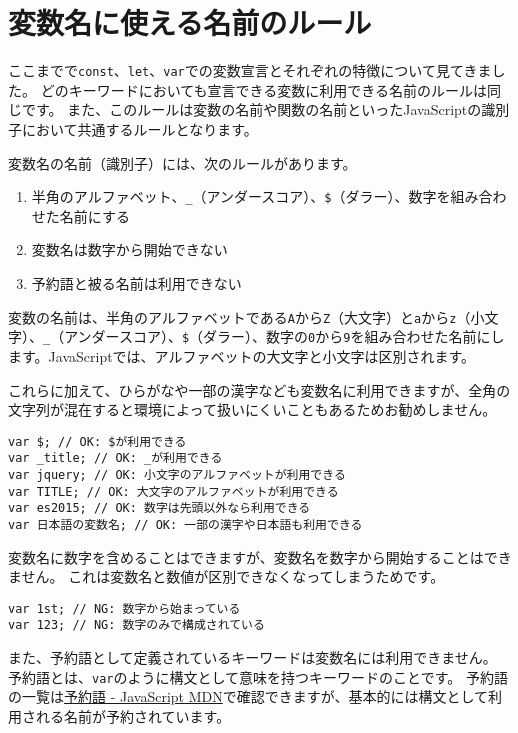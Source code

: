 \hypertarget{variable-name}{%
\section{変数名に使える名前のルール}\label{variable-name}}

ここまでで\texttt{const}、\texttt{let}、\texttt{var}での変数宣言とそれぞれの特徴について見てきました。
どのキーワードにおいても宣言できる変数に利用できる名前のルールは同じです。
また、このルールは変数の名前や関数の名前といったJavaScriptの識別子において共通するルールとなります。

変数名の名前（識別子）には、次のルールがあります。

\begin{enumerate}
\def\labelenumi{\arabic{enumi}.}
\item
  半角のアルファベット、\texttt{\_}（アンダースコア）、\texttt{\$}（ダラー）、数字を組み合わせた名前にする
\item
  変数名は数字から開始できない
\item
  予約語と被る名前は利用できない
\end{enumerate}

変数の名前は、半角のアルファベットである\texttt{A}から\texttt{Z}（大文字）と\texttt{a}から\texttt{z}（小文字）、\texttt{\_}（アンダースコア）、\texttt{\$}（ダラー）、数字の\texttt{0}から\texttt{9}を組み合わせた名前にします。JavaScriptでは、アルファベットの大文字と小文字は区別されます。

これらに加えて、ひらがなや一部の漢字なども変数名に利用できますが、全角の文字列が混在すると環境によって扱いにくいこともあるためお勧めしません。

\begin{lstlisting}
var $; // OK: $が利用できる
var _title; // OK: _が利用できる
var jquery; // OK: 小文字のアルファベットが利用できる
var TITLE; // OK: 大文字のアルファベットが利用できる
var es2015; // OK: 数字は先頭以外なら利用できる
var 日本語の変数名; // OK: 一部の漢字や日本語も利用できる
\end{lstlisting}

変数名に数字を含めることはできますが、変数名を数字から開始することはできません。
これは変数名と数値が区別できなくなってしまうためです。

\begin{lstlisting}
var 1st; // NG: 数字から始まっている
var 123; // NG: 数字のみで構成されている
\end{lstlisting}

また、予約語として定義されているキーワードは変数名には利用できません。
予約語とは、\texttt{var}のように構文として意味を持つキーワードのことです。
予約語の一覧は\href{https://developer.mozilla.org/ja/docs/Web/JavaScript/Reference/Reserved_Words}{予約語
- JavaScript \textbar{}
MDN}で確認できますが、基本的には構文として利用される名前が予約されています。

